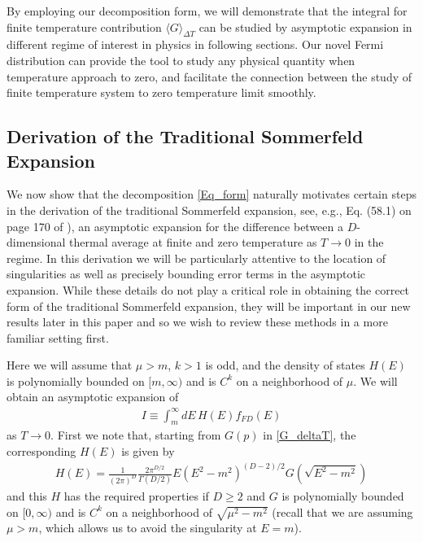 \documentclass[sn-mathphys,Numbered]{sn-jnl}
\begin{document}
By employing our decomposition form, we will demonstrate that the integral for finite temperature contribution $\langle G\rangle_{\Delta T}$ can be studied by asymptotic expansion in different regime of interest in physics in following sections. Our novel Fermi distribution can provide the tool to study any physical quantity when temperature approach to zero, and facilitate the connection between the study of finite temperature system to zero temperature limit smoothly. 




\subsection{Derivation of the Traditional Sommerfeld Expansion}\label{sec:classial_Sommerfeld}
We now show that the decomposition \eqref{Eq_form} naturally motivates certain steps in the derivation of the traditional Sommerfeld expansion, see, e.g., Eq. (58.1) on page 170 of \cite{landau2013statistical}), an  asymptotic expansion for the difference between a $D$-dimensional thermal average at finite and zero temperature as $T\to 0$ in the regime.  In this derivation we will be particularly attentive to the location of singularities as well as precisely bounding error terms in the asymptotic expansion.  While these details do not play a critical role in obtaining the correct form of the traditional Sommerfeld expansion, they will be important in our new results later in this paper and so we wish to review these methods in a more familiar setting first.


Here we will assume that $\mu>m$, $k>1$ is odd, and the density of states $H(E)$ is  polynomially bounded on $[m,\infty)$ and is $C^k$ on a neighborhood of $\mu$. We will obtain an asymptotic expansion of 
\begin{align}\label{eq:traditional_sommerfeld_I}
    I\equiv\int_m^\infty dE\, H(E) f_{FD}(E)
\end{align}
as $T\to 0$.  First we note that, starting from $G(p)$ in \eqref{G_deltaT}, the corresponding $H(E)$ is given by
\begin{align}
   H(E)= \frac{1}{(2\pi)^D}\frac{2\pi^{D/2}}{\Gamma(D/2)} E(E^2-m^2)^{(D-2)/2} G(\sqrt{E^2-m^2}) 
\end{align}
and this $H$ has the required properties if $D\geq 2$ and $G$ is polynomially bounded on $[0,\infty)$ and is $C^k$ on a neighborhood of $\sqrt{\mu^2-m^2}$ (recall that we are assuming $\mu>m$, which allows us to avoid the singularity at $E=m$).
\end{document}
